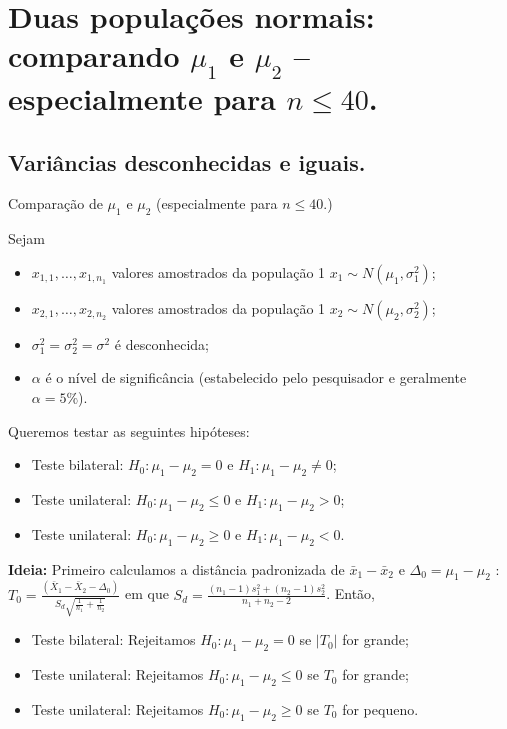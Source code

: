 \documentclass[9pt]{beamer}
\begin{document}
\section{Duas populações normais: comparando $\mu_1$ e $\mu_2$ -- especialmente para $n \leq 40$.}

\subsection{Variâncias desconhecidas e iguais.}

\begin{frame}{Comparação de $\mu_1$ e $\mu_2$ (especialmente para $n \leq 40$.)}

\small

Sejam
\begin{itemize}
	\item $x_{1,1}, \dots, x_{1, n_1}$ valores amostrados da população 1 $x_1 \sim N(\mu_1, \sigma_1^2)$;
	\item $x_{2,1}, \dots, x_{2, n_2}$ valores amostrados da população 1 $x_2 \sim N(\mu_2, \sigma_2^2)$;
	\item $\sigma_1^2=\sigma_2^2=\sigma^2$ é desconhecida;
	\item $\alpha$ é o nível de significância (estabelecido pelo pesquisador e geralmente $\alpha=5\%$). 
\end{itemize}
\vfill

Queremos testar as seguintes hipóteses:
\begin{itemize}
	\item Teste bilateral: $H_0: \mu_1 - \mu_2 = 0$ e $H_1: \mu_1 - \mu_2 \neq 0$;
	\item Teste unilateral: $H_0: \mu_1 - \mu_2 \leq 0$ e $H_1: \mu_1 - \mu_2 > 0$;
	\item Teste unilateral: $H_0: \mu_1 - \mu_2 \geq 0$ e $H_1: \mu_1 - \mu_2 < 0$.
\end{itemize}
\vfill

\textbf{Ideia:} Primeiro calculamos a distância padronizada de $\bar{x}_1 - \bar{x}_2$ e $\Delta_0=\mu_1 - \mu_2$ : $T_0 = \frac{(\bar{X}_1 - \bar{X}_2 - \Delta_0)}{S_d\sqrt{ \frac{1}{n_1} + \frac{1}{n_2} }}$ em que $S_d = \frac{(n_1-1) s_1^2 + (n_2-1) s_2^2}{n_1+n_2-2}$. Então, 
\begin{itemize}
	\item Teste bilateral: Rejeitamos $H_0: \mu_1 - \mu_2 =0$ se $\lvert T_0 \rvert$ for grande;
	\item Teste unilateral: Rejeitamos $H_0: \mu_1 - \mu_2 \leq 0$ se $T_0 $ for grande;
	\item Teste unilateral: Rejeitamos $H_0: \mu_1 - \mu_2 \geq 0$ se $T_0 $ for pequeno.
\end{itemize}

\normalsize
\end{frame}
\end{document}
